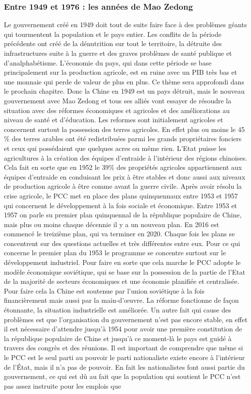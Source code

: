 \subsubsection{Entre 1949 et 1976 : les années de Mao Zedong }
Le gouvernement créé en 1949 doit tout de suite faire face à des problèmes géants qui tourmentent la population et le pays entier. Les conflits de la période précédente ont créé de la dénutrition sur tout le territoire, la détruite des infrastructures suite à la guerre et des graves problèmes de santé publique et d’analphabétisme. L’économie du pays, qui dans cette période se base principalement sur la production agricole, est en ruine avec un PIB très bas et une monnaie qui perde de valeur de plus en plus.  Ce thème sera approfondi dans le prochain chapitre. Donc la Chine en 1949 est un pays détruit, mais le nouveau gouvernement avec Mao Zedong et tous ses alliés vont essayer de résoudre la situation avec des réformes économiques et agricoles et des améliorations au niveau de santé et d’éducation.  Les reformes sont initialement agricoles et concernent surtout la possession des terres agricoles. En effet plus ou moins le 45 \% des terres arables ont été redistribuées parmi les grands propriétaires fonciers et ceux qui possédaient que quelques acres ou même rien.  L’Etat puisse les agricultures à la création des équipes d’entraide à l’intérieur des régions chinoises. Cela fait en sorte que en 1952 le 39\% des propriétés agricoles appartiennent aux équipes d’entraide en conduisant les prix à être stables et donc aussi aux niveaux de production agricole à être comme avant la guerre civile.  Après avoir résolu la crise agricole, le PCC met en place des plans quinquennaux entre 1953 et 1957 qui concernent le développement à la fois sociale et économique. Entre 1953 et 1957 on parle su premier plan quinquennal de la république populaire de Chine, mais plus ou moins chaque décennie il y a un nouveau plan. En 2016 est commencé le treizième plan, qui va terminer en 2020.  Chaque fois les plans se concentrent sur des questions actuelles et très différentes entre eux. Pour ce qui concerne le premier plan du 1953 le programme se concentre surtout sur le développement industriel. Pour faire en sorte que cela marche le PCC adopte le modèle économique soviétique, qui se base sur la possession de la partie de l’Etat de la majorité de secteurs économiques et une économie planifiée et centralisée. Pour faire cela la Chine est soutenue par l’union soviétique à la fois financièrement mais aussi par la main-d’œuvre. La réforme fonctionne de façon étonnante, la situation industrielle est améliorée.  Un autre fait qui cause des problèmes est que l’organisation du gouvernement n’est pas encore stable, en effet il est nécessaire d’attendre jusqu'à 1954 pour avoir une première constitution de la république populaire de Chine et jusqu’à ce moment-là le pays est guidé à travers des congrès et des réunions. Il est important de comprendre que même si le PCC est le seul parti au pouvoir le parti nationaliste existe encore à l’intérieur de l’État, mais il n’a pas de pouvoir. En fait les nationalistes font aussi partie du gouvernement, ce qui est dû au fait que la population qui soutient le PCC n’est pas assez instruite pour les emplois que 